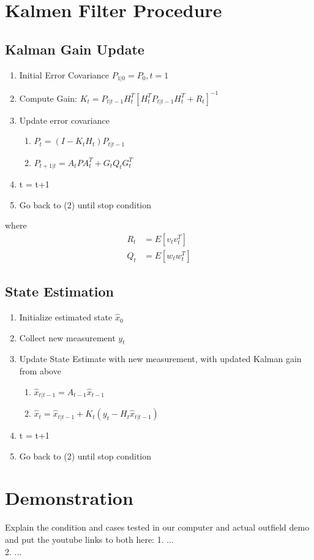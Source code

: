 \documentclass[12pt, letterpaper]{amsart} %
\numberwithin{equation}{section}
\begin{document}
\newpage
\section{Kalmen Filter Procedure}
\subsection{Kalman Gain Update}
\begin{enumerate}
\item Initial Error Covariance $P_{1|0} = P_0, t = 1$
\item Compute Gain: $K_t = P_{t|t-1} H_t^T [H_t^T P_{t|t-1} H_t^T + R_t]^{-1}$
\item Update error covariance
  \begin{enumerate}
  \item $P_t = (I-K_tH_t)P_{t|t-1}$
  \item $P_{t+1|t} = A_t P A_t^T + G_t Q_t G_t^T$
  \end{enumerate}
\item t = t+1
\item Go back to (2) until stop condition
\end{enumerate}
where
\begin{align*}
  R_t &= E[v_t v_t^T] \\
  Q_t &= E[w_t w_t^T]
\end{align*}

\subsection{State Estimation}
\begin{enumerate}
\item Initialize estimated state $\hat{x}_0$
\item Collect new measurement $y_t$
\item Update State Estimate with new measurement, with updated Kalman gain from above
  \begin{enumerate}
  \item $\hat{x}_{t|t-1} = A_{t-1} \hat{x}_{t-1}$ 
  \item $\hat{x}_t = \hat{x}_{t|t-1} + K_t(y_t - H_t \hat{x}_{t|t-1})$
  \end{enumerate}
\item t = t+1
\item Go back to (2) until stop condition  
\end{enumerate}
\newpage
\section{Demonstration}
Explain the condition and cases tested in our computer and actual outfield demo and put the youtube links to both here:
1. ... \\2. ...
\end{document}
